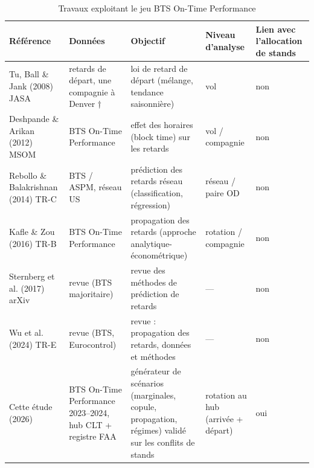 \begin{table}
\caption{Travaux exploitant le jeu BTS On-Time Performance}
\label{tab:lit2}
\begin{tabular}{lllll}
\toprule
Référence & Données & Objectif & Niveau d'analyse & Lien avec l'allocation de stands \\
\midrule
Tu, Ball \& Jank (2008) JASA & retards de départ, une compagnie à Denver † & loi de retard de départ (mélange, tendance saisonnière) & vol & non \\
Deshpande \& Arikan (2012) MSOM & BTS On-Time Performance & effet des horaires (block time) sur les retards & vol / compagnie & non \\
Rebollo \& Balakrishnan (2014) TR-C & BTS / ASPM, réseau US & prédiction des retards réseau (classification, régression) & réseau / paire OD & non \\
Kafle \& Zou (2016) TR-B & BTS On-Time Performance & propagation des retards (approche analytique-économétrique) & rotation / compagnie & non \\
Sternberg et al. (2017) arXiv & revue (BTS majoritaire) & revue des méthodes de prédiction de retards & — & non \\
Wu et al. (2024) TR-E & revue (BTS, Eurocontrol) & revue : propagation des retards, données et méthodes & — & non \\
Cette étude (2026) & BTS On-Time Performance 2023–2024, hub CLT + registre FAA & générateur de scénarios (marginales, copule, propagation, régimes) validé sur les conflits de stands & rotation au hub (arrivée + départ) & oui \\
\bottomrule
\end{tabular}
\end{table}
